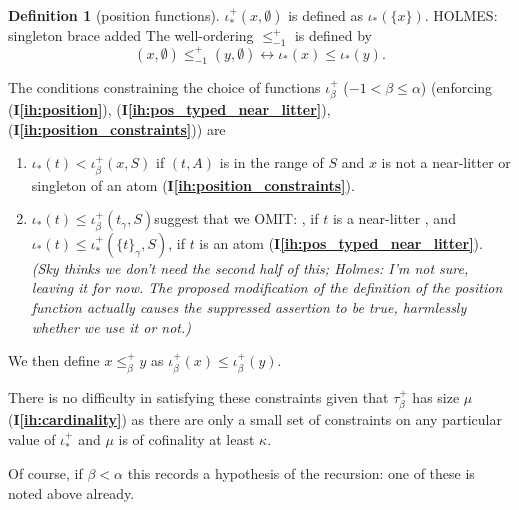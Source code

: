 \documentclass[112pt]{article}
\theoremstyle{definition}
\newtheorem{definition}[theorem]{Definition}
\theoremstyle{remark}
\newcommand{\ihref}[1]{(\textbf{I\ref{#1}})}
\newcommand{\rk}[1]{{\color{blue}\sl #1}}
\newcommand{\hsuggest}[1]{{\color{magenta}#1}}
\begin{document}
\begin{definition}[position functions]
$\iota_*^+(x,\emptyset)$ is defined as $\iota_*(\{x\})$. \hsuggest{HOLMES: singleton brace added}
The well-ordering $\leq_{-1}^+$ is defined by $$(x,\emptyset) \leq_{-1}^+ (y,\emptyset) \leftrightarrow \iota_*(x) \leq \iota_*(y).$$

\begin{comment}

The well-ordering $\leq_\alpha^+$ of $\tau_\alpha^+$ ($\alpha \in \lambda$) must satisfy the condition that for each $(x,S) \in \tau_\alpha^+$, for each $(z,A) \in {\tt rng}(S)$ and litter $L = f_{\beta,\gamma}(y,T)$ with $\beta<\alpha$,  where $L$  meets $z$, $\iota_*^+(y,T) < \iota_*^+(x,S)$ must hold.

\end{comment}

The conditions constraining the choice of functions $\iota^+_\beta$ ($-1 < \beta \leq \alpha$) ({enforcing }\ihref{ih:position}, \ihref{ih:pos_typed_near_litter}, \ihref{ih:position_constraints}) are

\begin{enumerate}

\item $\iota_*(t) < \iota^+_\beta(x,S)$ if $(t,A)$ is in the range of $S$ and $x$ is not a near-litter or singleton of an atom {\ihref{ih:position_constraints}}.

\item $\iota_*(t) \leq \iota^+_\beta(t_\gamma,S)$\hsuggest{suggest that we OMIT: , if $t$ is a near-litter  ,  and  $\iota_*(t) \leq \iota^+_*(\{t\}_\gamma,S)$, if $t$ is an atom} \ihref{ih:pos_typed_near_litter}. \rk{(Sky thinks we don't need the second half of this;  Holmes:  I'm not sure, leaving it for now.  The proposed modification of the definition of the position function actually causes the suppressed assertion to be true, harmlessly whether we use it or not.)}

\end{enumerate}

We then define $x \leq^+_\beta y$ as $\iota^+_\beta(x) \leq \iota^+_\beta(y)$.
\end{definition}

There is no difficulty in satisfying these constraints {given that $\tau_\beta^+$ has size $\mu$ \ihref{ih:cardinality}} as there are only a small set of constraints on any particular value of $\iota_*^+$ and $\mu$ is of cofinality at least $\kappa$.

Of course, if $\beta<\alpha$ this records a hypothesis of the recursion:  one of these is noted above already.
\end{document}
